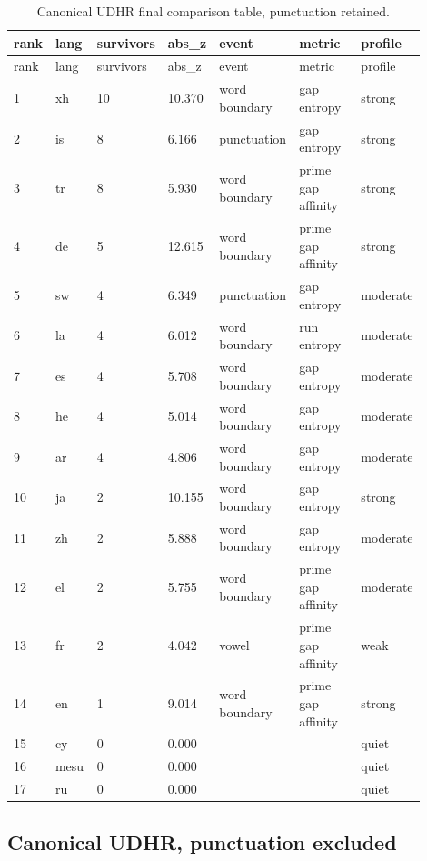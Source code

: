 \documentclass[11pt,a4paper]{article}
\begin{document}
\begingroup
\scriptsize
\setlength{\tabcolsep}{3pt}
\renewcommand{\arraystretch}{1.12}
\begin{longtable}{p{0.05\linewidth}p{0.11\linewidth}p{0.11\linewidth}p{0.10\linewidth}p{0.18\linewidth}p{0.25\linewidth}p{0.10\linewidth}}
\caption{Canonical UDHR final comparison table, punctuation retained.}\label{tab:canonical}\\
\toprule
rank & lang & survivors & abs\_z & event & metric & profile \\
\midrule
\endfirsthead
\toprule
rank & lang & survivors & abs\_z & event & metric & profile \\
\midrule
\endhead
1 & xh & 10 & 10.370 & word boundary & gap entropy & strong \\
2 & is & 8 & 6.166 & punctuation & gap entropy & strong \\
3 & tr & 8 & 5.930 & word boundary & prime gap affinity & strong \\
4 & de & 5 & 12.615 & word boundary & prime gap affinity & strong \\
5 & sw & 4 & 6.349 & punctuation & gap entropy & moderate \\
6 & la & 4 & 6.012 & word boundary & run entropy & moderate \\
7 & es & 4 & 5.708 & word boundary & gap entropy & moderate \\
8 & he & 4 & 5.014 & word boundary & gap entropy & moderate \\
9 & ar & 4 & 4.806 & word boundary & gap entropy & moderate \\
10 & ja & 2 & 10.155 & word boundary & gap entropy & strong \\
11 & zh & 2 & 5.888 & word boundary & gap entropy & moderate \\
12 & el & 2 & 5.755 & word boundary & prime gap affinity & moderate \\
13 & fr & 2 & 4.042 & vowel & prime gap affinity & weak \\
14 & en & 1 & 9.014 & word boundary & prime gap affinity & strong \\
15 & cy & 0 & 0.000 &  &  & quiet \\
16 & mesu & 0 & 0.000 &  &  & quiet \\
17 & ru & 0 & 0.000 &  &  & quiet \\
\bottomrule
\end{longtable}
\endgroup

\subsection{Canonical UDHR, punctuation excluded}
\end{document}
